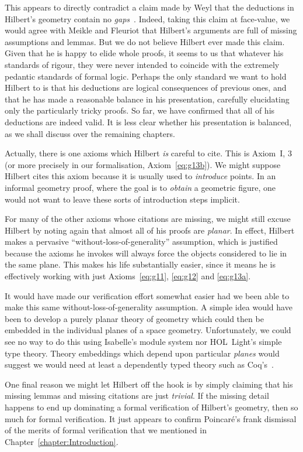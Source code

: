 This appears to directly contradict a claim made by Weyl that the deductions in Hilbert's geometry contain no \emph{gaps}~\cite{TableChairMug}. Indeed, taking this claim at face-value, we would agree with Meikle and Fleuriot that Hilbert's arguments are full of missing assumptions and lemmas. But we do not believe Hilbert ever made this claim. Given that he is happy to elide whole proofs, it seems to us that whatever his standards of rigour, they were never intended to coincide with the extremely pedantic standards of formal logic. Perhaps the only standard we want to hold Hilbert to is that his deductions are logical consequences of previous ones, and that he has made a reasonable balance in his presentation, carefully elucidating only the particularly tricky proofs. So far, we have confirmed that all of his deductions are indeed valid. It is less clear whether his presentation is balanced, as we shall discuss over the remaining chapters.

Actually, there is one axioms which Hilbert \emph{is} careful to cite. This is Axiom~I, 3 (or more precisely in our formalisation, Axiom~\ref{eq:g13b}). We might suppose Hilbert cites this axiom because it is usually used to \emph{introduce} points. In an informal geometry proof, where the goal is to \emph{obtain} a geometric figure, one would not want to leave these sorts of introduction steps implicit. 

For many of the other axioms whose citations are missing, we might still excuse Hilbert by noting again that almost all of his proofs are \emph{planar}. In effect, Hilbert makes a pervasive ``without-loss-of-generality'' assumption, which is justified because the axioms he invokes will always force the objects considered to lie in the same plane. This makes his life substantially easier, since it means he is effectively working with just Axioms~\ref{eq:g11}, \ref{eq:g12} and \ref{eq:g13a}. 

It would have made our verification effort somewhat easier had we been able to make this same without-loss-of-generality assumption. A simple idea would have been to develop a purely planar theory of geometry which could then be embedded in the individual planes of a space geometry. Unfortunately, we could see no way to do this using Isabelle's module system nor HOL~Light's simple type theory. Theory embeddings which depend upon particular \emph{planes} would suggest we would need at least a dependently typed theory such as Coq's~\cite{Coq}.

One final reason we might let Hilbert off the hook is by simply claiming that his missing lemmas and missing citations are just \emph{trivial}. If the missing detail happens to end up dominating a formal verification of Hilbert's geometry, then so much for formal verification. It just appears to confirm Poincar\'{e}'s frank dismissal of the merits of formal verification that we mentioned in Chapter~\ref{chapter:Introduction}. 

